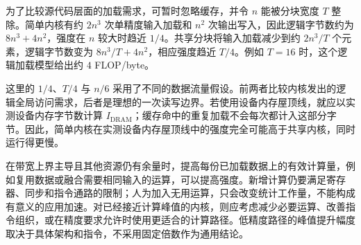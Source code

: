 为了比较源代码层面的加载需求，可暂时忽略缓存，并令 $n$ 能被分块宽度 $T$ 整除。简单内核有约 $2n^3$ 次单精度输入加载和 $n^2$ 次输出写入，因此逻辑字节数约为 $8n^3+4n^2$，强度在 $n$ 较大时趋近 $1/4$。共享分块将输入加载减少到约 $2n^3/T$ 个元素，逻辑字节数变为 $8n^3/T+4n^2$，相应强度趋近 $T/4$。例如 $T=16$ 时，这个逻辑加载模型给出约 $4$ FLOP/byte。

这里的 $1/4$、$T/4$ 与 $n/6$ 采用了不同的数据流量假设。前两者比较内核发出的逻辑全局访问需求，后者是理想的一次读写边界。若使用设备内存屋顶线，就应以实测设备内存字节数计算 $I_{\mathrm{DRAM}}$；缓存命中的重复加载不会每次都计入这部分字节。因此，简单内核在实测设备内存屋顶线中的强度完全可能高于共享内核，同时运行得更慢。

在带宽上界主导且其他资源仍有余量时，提高每份已加载数据上的有效计算量，例如复用数据或融合需要相同输入的运算，可以提高强度。新增计算仍要满足寄存器、同步和指令通路的限制；人为加入无用运算，只会改变统计工作量，不能构成有意义的应用加速。对已经接近计算峰值的内核，则应考虑减少必要运算、改善指令组织，或在精度要求允许时使用更适合的计算路径。低精度路径的峰值提升幅度取决于具体架构和指令，不采用固定倍数作为通用结论。

